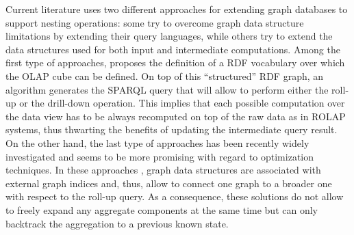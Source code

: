 Current literature uses two different approaches for extending
graph databases to support nesting operations:
some try to overcome graph data structure limitations by extending their query languages, while others try to extend the data structures used for both input and intermediate computations. Among the first type of approaches, \cite{Etcheverry2012} proposes the definition of a RDF  vocabulary over which the OLAP  cube can be defined. On top of this ``structured'' RDF graph, an algorithm generates the SPARQL query that will allow to perform either the roll-up or the drill-down operation. This implies that each possible computation over the data view has to be always recomputed on top of the raw data as in ROLAP systems, thus thwarting the benefits of updating the intermediate query result. On the other hand, the last type of approaches has been recently widely investigated  and seems to be more promising with regard to optimization techniques. In these approaches \cite{Tian20085,ChenYZHY08,Qu2011}, graph data structures are associated with external graph indices and, thus, allow to connect one graph to a broader one with respect to the roll-up query. As a consequence, these solutions do not allow to freely expand any aggregate components at the same time but can only backtrack the aggregation to a previous known state. %


